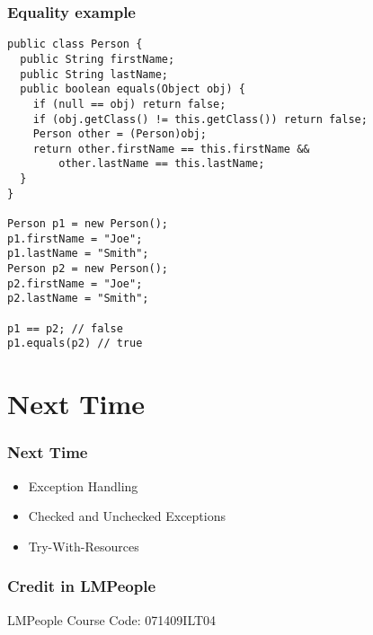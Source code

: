 \documentclass{beamer}
\begin{document}
\begin{frame}[fragile]
\frametitle{Equality example}
\lstset{language=Java}
\begin{lstlisting}
public class Person {
  public String firstName;
  public String lastName;
  public boolean equals(Object obj) {
    if (null == obj) return false;
    if (obj.getClass() != this.getClass()) return false;
    Person other = (Person)obj;
    return other.firstName == this.firstName && 
        other.lastName == this.lastName;
  }
}

Person p1 = new Person(); 
p1.firstName = "Joe";
p1.lastName = "Smith";
Person p2 = new Person(); 
p2.firstName = "Joe";
p2.lastName = "Smith";

p1 == p2; // false
p1.equals(p2) // true
\end{lstlisting}

\end{frame}



\section{Next Time}
\begin{frame}
\frametitle{Next Time}
\begin{itemize}
\item Exception Handling
\item Checked and Unchecked Exceptions
\item Try-With-Resources
\end{itemize}
\end{frame}


\begin{frame}
\frametitle{Credit in LMPeople}
\begin{center}
LMPeople Course Code: 071409ILT04
\end{center}
\end{frame}
\end{document}
